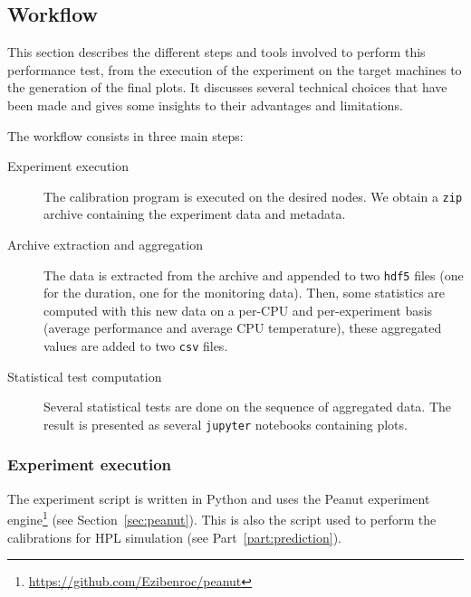        \subsection{Workflow}%
        \label{sub:workflow}

            This section describes the different steps and tools involved to perform this performance test, from the
            execution of the experiment on the target machines to the generation of the final plots. It discusses
            several technical choices that have been made and gives some insights to their advantages and limitations.

            The workflow consists in three main steps:
            \begin{description}
                \item[Experiment execution] The \dgemm calibration program is executed on the desired nodes. We obtain
                    a \texttt{zip} archive containing the experiment data and metadata.
                \item[Archive extraction and aggregation] The data is extracted from the archive and appended to two
                    \texttt{hdf5} files (one for the \dgemm duration, one for the monitoring data). Then, some
                    statistics are computed with this new data on a per-CPU and per-experiment basis (\eg average \dgemm
                    performance and average CPU temperature), these aggregated values are added to two \texttt{csv}
                    files.
                \item[Statistical test computation] Several statistical tests are done on the sequence of aggregated
                    data. The result is presented as several \texttt{jupyter} notebooks containing plots.
            \end{description}

            \subsubsection{Experiment execution}%

                The experiment script is written in Python and uses the Peanut experiment
                engine\footnote{\url{https://github.com/Ezibenroc/peanut}} (see
                Section~\ref{sec:peanut}). This is also the script used to perform the \dgemm calibrations for HPL
                simulation (see Part~\ref{part:prediction}).

